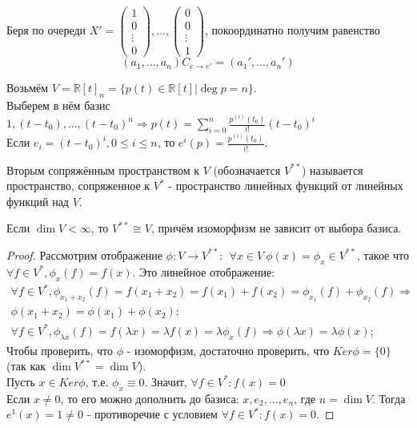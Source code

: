     Беря по очереди $X' = \begin{pmatrix} 1 \\ 0 \\ \vdots \\ 0 \end{pmatrix}, \dots , \begin{pmatrix} 0 \\ 0 \\ \vdots \\ 1 \end{pmatrix}$, покоординатно получим равенство \[(a_1,...,a_n)C_{e\rightarrow e'} = (a_1',...,a_n')\]
    \begin{example1}
        Возьмём $V = \mathbb{R}[t]_n = \{p(t) \in \mathbb{R}[t] | \deg p = n\}$.\\
        Выберем в нём базис $1, (t-t_0), ... , (t-t_0)^n \Rightarrow p(t) = \sum \limits_{i=0}^n \frac{p^{(i)}(t_0)}{i!}(t-t_0)^i$\\
        Если $e_i = (t-t_0)^i, 0\leqslant i\leqslant n$, то $e^i(p) = \frac{p^{(i)}(t_0)}{i!}$.    
    \end{example1}
    \begin{definition}
        Вторым сопряжённым пространством к $V$ (обозначается $V^{**}$) называется пространство, сопряженное к $V^{*}$ - пространство линейных функций от линейных функций над $V$.
    \end{definition}
    \begin{theorem}
        Если $\dim V < \infty$, то $V^{**} \cong V$, причём изоморфизм не зависит от выбора базиса.
    \end{theorem}
    \begin{proof}
        Рассмотрим отображение $\phi: V \rightarrow V^{**}: \ \ \forall x \in V \ \phi(x) = \phi_x \in V^{**}$, такое что $\forall f\in V^{*}, \phi_x(f) = f(x)$.
        Это линейное отображение:
        \begin{align*}
            \forall f\in V^{*}, \phi_{x_1+x_2}(f) = f(x_1 + x_2) = f(x_1) + f(x_2) = \phi_{x_1}(f) + \phi_{x_2}(f) \Rightarrow \\ \phi(x_1 + x_2) = \phi(x_1) + \phi(x_2);\\
            \forall f\in V^{*}, \phi_{\lambda x}(f) = f(\lambda x) = \lambda f(x) = \lambda\phi_{x}(f) \Rightarrow \phi(\lambda x) = \lambda\phi(x);
        \end{align*}
        Чтобы проверить, что $\phi$ - изоморфизм, достаточно проверить, что $Ker\phi = \{0\}$ (так как $\dim V^{**} = \dim V$).\\
        Пусть $x \in Ker\phi$, т.е. $\phi_x \equiv 0$. Значит,  $\forall f \in V^{*} : f(x) = 0$\\
        Если $x \neq 0$, то его можно дополнить до базиса: $x, e_2, ... , e_n$, где $n = \dim V$.
        Тогда $e^1(x) = 1 \neq 0$ - противоречие с условием $\forall f \in V^{*} : f(x) = 0$.
    \end{proof}
